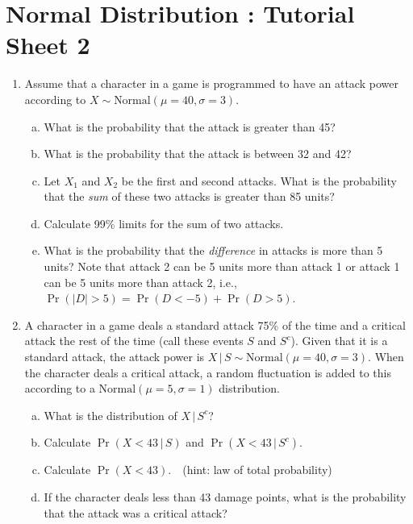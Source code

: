 \documentclass[a4paper,12pt]{article}
\begin{document}
\section*{Normal Distribution : Tutorial Sheet 2}

\begin{enumerate}



\item 

Assume that a character in a game is programmed to have an attack power according to $X \sim \text{Normal}(\mu=40,\sigma=3)$.\\[-0.2cm]



\begin{enumerate}[(a)]

\item What is the probability that the attack is greater than 45? \item What is the probability that the attack is between 32 and 42? \item Let $X_1$ and $X_2$ be the first and second attacks. What is the probability that the \emph{sum} of these two attacks is greater than 85 units? \quad \item Calculate 99\% limits for the sum of two attacks.  \item What is the probability that the \emph{difference} in attacks is more than 5 units? Note that attack 2 can be 5 units more than attack 1 or attack 1 can be 5 units more than attack 2, i.e., $\Pr(|D|>5)=\Pr(D<-5) + \Pr(D>5)$.

\end{enumerate}






\item A character in a game deals a standard attack 75\% of the time and a critical attack the rest of the time (call these events $S$ and $S^c$). Given that it is a standard attack, the attack power is $X\,|\,S \sim \text{Normal}(\mu=40,\sigma=3)$. When the character deals a critical attack, a random fluctuation is added to this according to a $\text{Normal}(\mu=5,\sigma=1)$ distribution.\\[-0.2cm]



\begin{enumerate}[(a)]

\item What is the distribution of $X\,|\,S^c$? \item Calculate $\Pr(X<43\,|\,S)$ and $\Pr(X<43\,|\,S^c)$. \item Calculate $\Pr(X<43)$. \,\, (hint: law of total probability) \item If the character deals less than 43 damage points, what is the probability that the attack was a critical attack?


\end{enumerate}
\end{enumerate}
\end{document}
